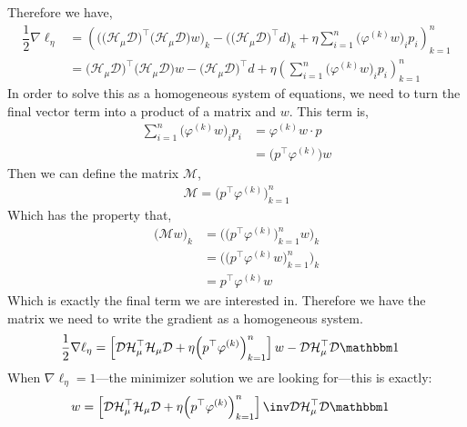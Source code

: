 \documentclass{article}
\begin{document}
Therefore we have,
\begin{align*}
    \dfrac12\nabla\ell_\eta&=\left(\Big(\big(\mathcal H_\mu\mathcal D\big)^\top\big(\mathcal H_\mu\mathcal D\big)w\Big)_k-\Big(\big(\mathcal H_\mu\mathcal D\big)^\top d\Big)_k+\eta\sum_{i=1}^n\big(\varphi^{(k)}w\big)_ip_i\right)_{k=1}^n \\
    &=\big(\mathcal H_\mu\mathcal D\big)^\top\big(\mathcal H_\mu\mathcal D\big)w-\big(\mathcal H_\mu\mathcal D\big)^\top d+\eta\left(\sum_{i=1}^n\big(\varphi^{(k)}w\big)_ip_i\right)_{k=1}^n
\end{align*}
In order to solve this as a homogeneous system of equations, we need to turn the final vector term into a product of a matrix and $w$. This term is,
\begin{align*}
    \sum_{i=1}^n\big(\varphi^{(k)}w\big)_ip_i&=\varphi^{(k)}w\cdot p \\
    &=\big(p^\top\varphi^{(k)}\big)w
\end{align*}
Then we can define the matrix $\mathcal M$,
\begin{align*}
    \mathcal M=\Big(p^\top\varphi^{(k)}\Big)_{k=1}^n
\end{align*}
Which has the property that,
\begin{align*}
    \big(\mathcal Mw\big)_k&=\Big(\Big(p^\top\varphi^{(k)}\Big)_{k=1}^nw\Big)_k \\
    &=\Big(\Big(p^\top\varphi^{(k)}w\Big)_{k=1}^n\Big)_k \\
    &=p^\top\varphi^{(k)}w
\end{align*}
Which is exactly the final term we are interested in.
Therefore we have the matrix we need to write the gradient as a homogeneous system.
\begin{align*}
    \dfrac12\nabla\ell_\eta&=\left[\mathcal D\mathcal H_\mu^\top\mathcal H_\mu\mathcal D+\eta\Big(p^\top\varphi^{(k)}\Big)_{k=1}^n\right]w-\mathcal D\mathcal H_\mu^\top \mathcal D\mathbbm1
\end{align*}
When $\nabla\ell_\eta=1$—the minimizer solution we are looking for—this is exactly:
\begin{align*}
    w&=\left[\mathcal D\mathcal H_\mu^\top\mathcal H_\mu\mathcal D+\eta\Big(p^\top\varphi^{(k)}\Big)_{k=1}^n\right]\inv\mathcal D\mathcal H_\mu^\top \mathcal D\mathbbm1
\end{align*}
\end{document}
